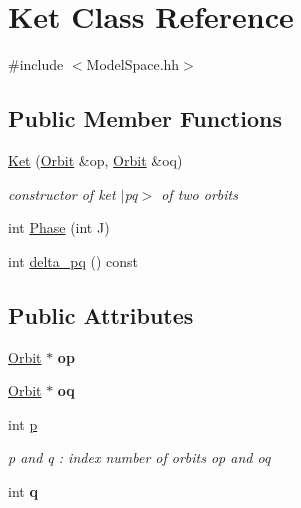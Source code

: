 \hypertarget{classKet}{}\section{Ket Class Reference}
\label{classKet}


{\ttfamily \#include $<$Model\+Space.\+hh$>$}

\subsection*{Public Member Functions}
\begin{DoxyCompactItemize}
\item 
\mbox{\label{classKet_acbf992b0310758f890a6a0ae659c1a46}} 
\hyperlink{classKet_acbf992b0310758f890a6a0ae659c1a46}{Ket} (\hyperlink{classOrbit}{Orbit} \&op, \hyperlink{classOrbit}{Orbit} \&oq)
\begin{DoxyCompactList}\small\item\em constructor of ket $\vert$pq$>$ of two orbits \end{DoxyCompactList}\item 
int \hyperlink{classKet_ac07bfbc7c7f2bdf77341ba6d54036e8e}{Phase} (int J)
\item 
int \hyperlink{classKet_ab0b7b429bb33880b1e1302d70d93194a}{delta\+\_\+pq} () const
\end{DoxyCompactItemize}
\subsection*{Public Attributes}
\begin{DoxyCompactItemize}
\item 
\mbox{\label{classKet_a9210bf82629ea07996f3b895bc54ba4d}} 
\hyperlink{classOrbit}{Orbit} $\ast$ {\bfseries op}
\item 
\mbox{\label{classKet_aa509bf4e812f84bb4c81b00a10d9e82f}} 
\hyperlink{classOrbit}{Orbit} $\ast$ {\bfseries oq}
\item 
\mbox{\label{classKet_a3120fbd6d28583a0e06d6426e0e69c83}} 
int \hyperlink{classKet_a3120fbd6d28583a0e06d6426e0e69c83}{p}
\begin{DoxyCompactList}\small\item\em p and q \+: index number of orbits op and oq \end{DoxyCompactList}\item 
\mbox{\label{classKet_afd050bca27dacccd2637266804b4d710}} 
int {\bfseries q}
\end{DoxyCompactItemize}


